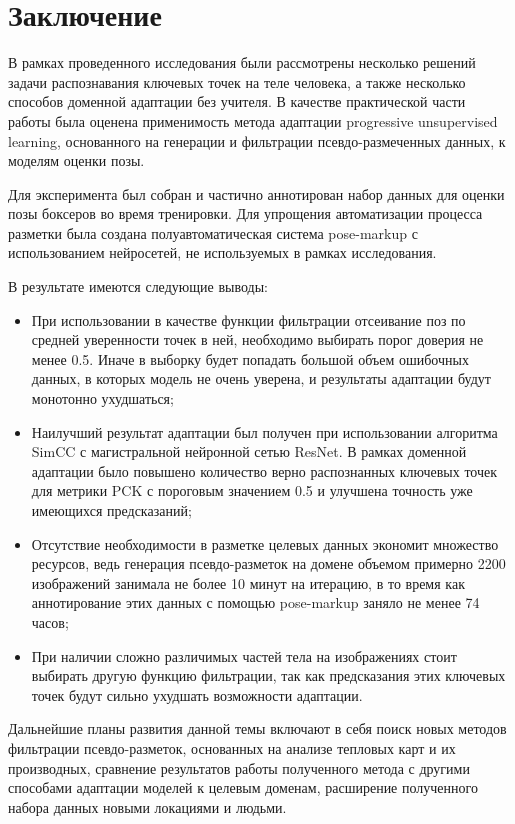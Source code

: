 \section{Заключение}
\label{sec:Chapter6} 


В рамках проведенного исследования были рассмотрены несколько решений задачи распознавания ключевых точек на теле человека, а также несколько способов доменной адаптации без учителя. В качестве практической части работы была оценена применимость метода адаптации progressive unsupervised learning, основанного на генерации и фильтрации псевдо-размеченных данных, к моделям оценки позы. 

Для эксперимента был собран и частично аннотирован набор данных для оценки позы боксеров во время тренировки. Для упрощения автоматизации процесса разметки была создана полуавтоматическая система pose-markup с использованием нейросетей, не используемых в рамках исследования.

В результате имеются следующие выводы:

\begin{itemize}
\item При использовании в качестве функции фильтрации отсеивание поз по средней уверенности точек в ней, необходимо выбирать порог доверия не менее 0.5. Иначе в выборку будет попадать большой объем ошибочных данных, в которых модель не очень уверена, и результаты адаптации будут монотонно ухудшаться;
\item Наилучший результат адаптации был получен при использовании алгоритма SimCC  с магистральной нейронной сетью ResNet. В рамках доменной адаптации было повышено количество верно распознанных ключевых точек для метрики PCK с пороговым значением 0.5 и улучшена точность уже имеющихся предсказаний;
\item Отсутствие необходимости в разметке целевых данных экономит множество ресурсов, ведь генерация псевдо-разметок на домене объемом примерно 2200 изображений занимала не более 10 минут на итерацию, в то время как аннотирование этих данных с помощью pose-markup заняло не менее 74 часов;
\item При наличии сложно различимых частей тела на изображениях стоит выбирать другую функцию фильтрации, так как предсказания этих ключевых точек будут сильно ухудшать возможности адаптации.
\end{itemize}

Дальнейшие планы развития данной темы включают в себя поиск новых методов фильтрации псевдо-разметок, основанных на анализе тепловых карт и их производных, сравнение результатов работы полученного метода с другими способами адаптации моделей к целевым доменам, расширение полученного набора данных новыми локациями и людьми.

\newpage